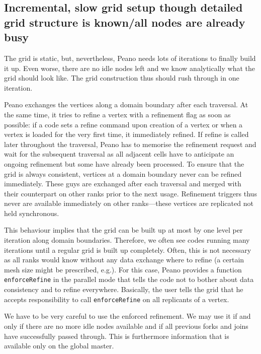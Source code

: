 \subsection{Incremental, slow grid setup though detailed grid structure is
known/all nodes are already busy}


\begin{smell}
The grid is static, but, nevertheless, Peano needs lots of iterations to finally
build it up. Even worse, there are no idle nodes left and we know analytically
what the grid should look like.
The grid construction thus should rush through in one iteration.
\end{smell}


\noindent
Peano exchanges the vertices along a domain boundary after each traversal.
At the same time, it tries to refine a vertex with a refinement flag as soon as
possible: 
if a code sets a refine command upon creation of a vertex or when a vertex is
loaded for the very first time, it immediately refined.
If refine is called later throughout the traversal, Peano has to memorise the 
refinement request and wait for the subsequent traversal as all adjacent cells
have to anticipate an ongoing refinement but some have already been processed.
To ensure that the grid is always consistent, vertices at a domain boundary
never can be refined immediately. 
These guys are exchanged after each traversal and merged with their counterpart
on other ranks prior to the next usage. 
Refinement triggers thus never are available immediately on other ranks---these
vertices are replicated not held synchronous.

This behaviour implies that the grid can be built up at most by one level per
iteration along domain boundaries.
Therefore, we often see codes running many iterations until a regular grid is
built up completely.
Often, this is not necessary as all ranks would know without any data
exchange where to refine (a certain mesh size might be prescribed, e.g.).
For this case, Peano provides a function \texttt{enforceRefine} in the parallel
mode that tells the code not to bother about data consistency and to refine 
everywhere. 
Basically, the user tells the grid that he accepts responsibility to call 
\texttt{enforceRefine} on all replicants of a vertex.

We have to be very careful to use the enforced refinement.
We may use it if and only if there are no more idle nodes available and if all
previous forks and joins have successfully passed through. 
This is furthermore information that is available only on the global master. 

